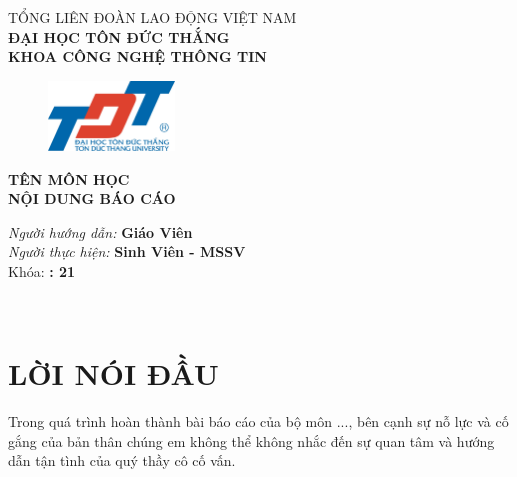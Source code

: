 \documentclass[oneside, 12pt]{report}   	%
\begin{document}
\graphicspath{ {./images/Logo/} }
\begin{titlepage}
	\begin{center}
		{\large TỔNG LIÊN ĐOÀN LAO ĐỘNG VIỆT NAM}\\
		{\large \textbf {ĐẠI HỌC TÔN ĐỨC THẮNG}}\\
		{\large \textbf {KHOA CÔNG NGHỆ THÔNG TIN}}\\
		
	
		\vspace{12pt}
	
		\begin{figure}[h]
			\centering
			\includegraphics[width=0.3\textwidth]{TDTU_logo}
		\end{figure}
		
		\vspace{12pt}
	
		{\Large \textbf {TÊN MÔN HỌC}}\\
		\vspace{22pt}
		{\LARGE \textbf { NỘI DUNG BÁO CÁO }}
	\end{center}



	\vspace{100pt}

	\begin{flushright}
		\textit{Người hướng dẫn: } \textbf{Giáo Viên}\\
		\textit{Người thực hiện: } \textbf{Sinh Viên - MSSV}\\
		Khóa: \textbf{: 21}\\
	\end{flushright}

	\vspace{82pt}

	\\
\end{titlepage}

\setcounter{secnumdepth}{-1}

\newpage
\section{\centering LỜI NÓI ĐẦU}

Trong quá trình hoàn thành bài báo cáo của bộ môn ..., bên cạnh sự nỗ lực và cố gắng của bản thân chúng em không thể không nhắc đến sự quan tâm và hướng dẫn tận tình của quý thầy cô cố vấn.
\end{document}
